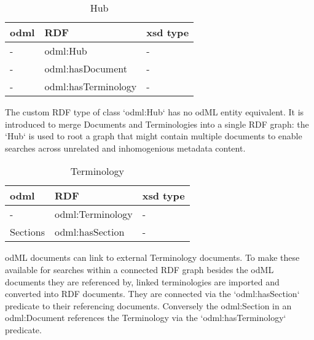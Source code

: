 \documentclass{article}
\begin{document}
\begin{table}
\begin{threeparttable}
\caption{Hub}
\begin{tabular}{l|l|l}
    odml            & RDF                           & xsd type \\
\hline
    -               & odml:Hub                      & - \\
    -               & odml:hasDocument              & - \\
    -               & odml:hasTerminology           & - \\
\end{tabular}
\begin{tablenotes}
\item The custom RDF type of class `odml:Hub` has no odML entity equivalent. It is
introduced to merge Documents and Terminologies into a single RDF graph: the `Hub` is
used to root a graph that might contain multiple documents to enable searches across
unrelated and inhomogenious metadata content.
\end{tablenotes}
\end{threeparttable}
\end{table}

\begin{table}
\begin{threeparttable}
\caption{Terminology}
\begin{tabular}{l|l|l}
    odml            & RDF                               & xsd type \\
\hline
    -               & odml:Terminology                  & - \\
    Sections        & odml:hasSection                   & - \\

\end{tabular}
\begin{tablenotes}
\item odML documents can link to external Terminology documents. To make
these available for searches within a connected RDF graph besides the odML documents they
are referenced by, linked terminologies are imported and converted into RDF documents.
They are connected via the `odml:hasSection` predicate to their referencing documents.
Conversely the odml:Section in an odml:Document references the Terminology via the
`odml:hasTerminology` predicate.
\end{tablenotes}
\end{threeparttable}
\end{table}
\end{document}
